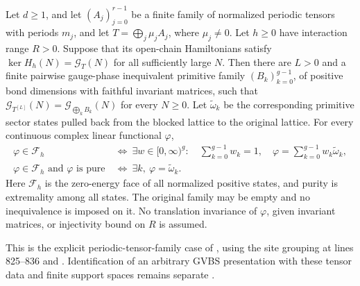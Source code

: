 \begin{lemma}
    \label{thm:periodic_block_family_ground_states}
    \leanok
    Let $d\geq1$, and let $(A_j)_{j=0}^{r-1}$ be a finite family of normalized periodic tensors
    with periods $m_j$, and let $T=\bigoplus_j\mu_jA_j$, where $\mu_j\neq0$.
    Let $h\geq0$ have interaction range $R>0$. Suppose that its open-chain
    Hamiltonians satisfy $\ker H_h(N)=\mathcal G_T(N)$ for all sufficiently
    large $N$. Then there are $L>0$ and a finite pairwise gauge-phase
    inequivalent primitive family $(B_k)_{k=0}^{g-1}$, of positive bond
    dimensions with faithful invariant matrices, such that
    $\mathcal G_{T^{[L]}}(N)=\mathcal G_{\bigoplus_kB_k}(N)$ for every
    $N\geq0$. Let $\widetilde\omega_k$ be the corresponding primitive
    sector states pulled back from the blocked lattice to the original
    lattice. For every continuous complex linear functional $\varphi$,
    \begin{align}
        \varphi\in\mathcal F_h
         & \ \Longleftrightarrow\
        \exists w\in[0,\infty)^g:\quad
        \sum_{k=0}^{g-1} w_k=1,\quad
        \varphi=\sum_{k=0}^{g-1} w_k\widetilde\omega_k, \\
        \varphi\in\mathcal F_h\text{ and }\varphi\text{ is pure}
         & \ \Longleftrightarrow\
        \exists k,\ \varphi=\widetilde\omega_k.
    \end{align}
    Here $\mathcal F_h$ is the zero-energy face of all normalized positive
    states, and purity is extremality among all states. The original
    family may be empty and no inequivalence is imposed on it.
    No translation invariance of $\varphi$, given invariant matrices,
    or injectivity bound on $R$ is assumed.

    This is the explicit periodic-tensor-family case of
    \cite[Theorems~1.1--1.2, Section~3]{Nachtergaele1996Spectral}, using
    the site grouping at lines 825--836 and
    \cite[Lemma~6]{DeLasCuevas2017Irreducible}.
    Identification of an arbitrary GVBS presentation with these tensor
    data and finite support spaces remains separate
    \cite{gap:nachtergaele96_infinite_volume_ground_projection}.
\end{lemma}
